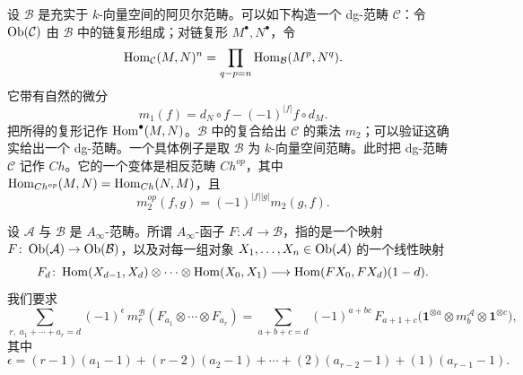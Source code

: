 设 $\mathcal{B}$ 是充实于 $k$-向量空间的阿贝尔范畴。可以如下构造一个 dg-范畴 $\mathcal{C}$：令 $\operatorname{Ob}(\mathcal{C})$ 由 $\mathcal{B}$ 中的链复形组成；对链复形 $M^\bullet,N^\bullet$，令
\begin{equation}\label{eq:ainf-hom-complex}
\operatorname{Hom}_{\mathcal{C}}(M,N)^n=\prod_{q-p=n}\operatorname{Hom}_{\mathcal{B}}(M^p,N^q).
\end{equation}
它带有自然的微分
\begin{equation}\label{eq:ainf-differential}
m_1(f)=d_N\circ f-(-1)^{|f|}f\circ d_M .
\end{equation}
把所得的复形记作 $\operatorname{Hom}^\bullet(M,N)$。$\mathcal{B}$ 中的复合给出 $\mathcal{C}$ 的乘法 $m_2$；可以验证这确实给出一个 dg-范畴。一个具体例子是取 $\mathcal{B}$ 为 $k$-向量空间范畴。此时把 dg-范畴 $\mathcal{C}$ 记作 $Ch$。它的一个变体是相反范畴 $Ch^{op}$，其中 $\operatorname{Hom}_{Ch^{op}}(M,N)=\operatorname{Hom}_{Ch}(N,M)$，且
\begin{equation}\label{eq:ainf-opposite}
m_2^{op}(f,g)=(-1)^{|f||g|}m_2(g,f).
\end{equation}



\begin{definition*}
设 $\mathcal{A}$ 与 $\mathcal{B}$ 是 $A_\infty$-范畴。所谓 $A_\infty$-函子 $F\colon\mathcal{A}\to\mathcal{B}$，指的是一个映射 $F\colon\operatorname{Ob}(\mathcal{A})\to\operatorname{Ob}(\mathcal{B})$，以及对每一组对象 $X_1,\dots,X_n\in\operatorname{Ob}(\mathcal{A})$ 的一个线性映射
\[
F_d\colon \operatorname{Hom}(X_{d-1},X_d)\otimes\cdots\otimes\operatorname{Hom}(X_0,X_1)\longrightarrow \operatorname{Hom}(FX_0,FX_d)(1-d).
\]
我们要求
\begin{equation}\label{eq:ainf-functor}
\sum_{r,\;a_1+\cdots+a_r=d}(-1)^{\epsilon}\,m_r^{\mathcal{B}}(F_{a_1}\otimes\cdots\otimes F_{a_r})
=\sum_{a+b+c=d}(-1)^{a+bc}\,F_{a+1+c}\bigl(\mathbf{1}^{\otimes a}\otimes m_b^{\mathcal{A}}\otimes\mathbf{1}^{\otimes c}\bigr),
\end{equation}
其中
\begin{equation}\label{eq:ainf-epsilon}
\epsilon=(r-1)(a_1-1)+(r-2)(a_2-1)+\cdots+(2)(a_{r-2}-1)+(1)(a_{r-1}-1).
\end{equation}
\end{definition*}

